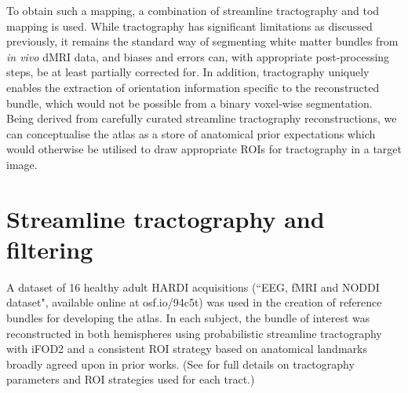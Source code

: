 To obtain such a mapping, a combination of streamline tractography and \gls{tod} mapping \autocite{Dhollander2014} is used.
While tractography has significant limitations as discussed previously, it remains the standard way of segmenting white matter bundles from \textit{in vivo} dMRI data, and biases and errors can, with appropriate post-processing steps, be at least partially corrected for.
In addition, tractography uniquely enables the extraction of orientation information specific to the reconstructed bundle, which would not be possible from a binary voxel-wise segmentation.
Being derived from carefully curated streamline tractography reconstructions, we can conceptualise the atlas as a store of anatomical prior expectations which would otherwise be utilised to draw appropriate ROIs for tractography in a target image.

\section{Streamline tractography and filtering}

A dataset of 16 healthy adult HARDI acquisitions (``EEG, fMRI and NODDI dataset",\autocite{Clayden2020} available online at osf.io/94c5t) was used in the creation of reference bundles for developing the atlas.
In each subject, the bundle of interest was reconstructed in both hemispheres using probabilistic streamline tractography with iFOD2 \autocite{Tournier2010} and a consistent ROI strategy based on anatomical landmarks broadly agreed upon in prior works. (See  for full details on tractography parameters and ROI strategies used for each tract.)



